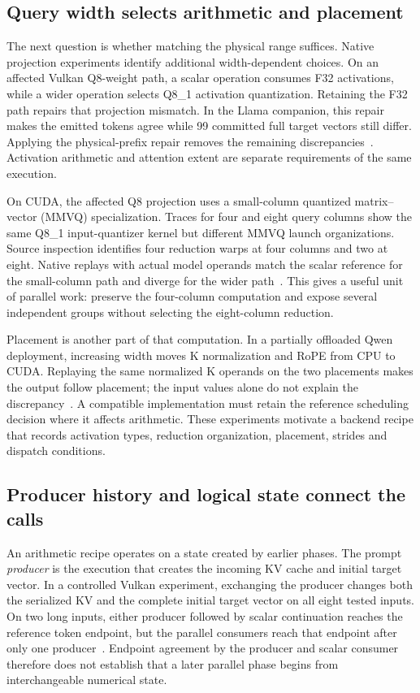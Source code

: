 \subsection{Query width selects arithmetic and placement}
The next question is whether matching the physical range suffices. Native projection experiments identify additional width-dependent choices. On an affected Vulkan Q8-weight path, a scalar operation consumes F32 activations, while a wider operation selects Q8\_1 activation quantization. Retaining the F32 path repairs that projection mismatch. In the Llama companion, this repair makes the emitted tokens agree while 99 committed full target vectors still differ. Applying the physical-prefix repair removes the remaining discrepancies~\cite{records}. Activation arithmetic and attention extent are separate requirements of the same execution.

On CUDA, the affected Q8 projection uses a small-column quantized matrix--vector (MMVQ) specialization. Traces for four and eight query columns show the same Q8\_1 input-quantizer kernel but different MMVQ launch organizations. Source inspection identifies four reduction warps at four columns and two at eight. Native replays with actual model operands match the scalar reference for the small-column path and diverge for the wider path~\cite{records}. This gives a useful unit of parallel work: preserve the four-column computation and expose several independent groups without selecting the eight-column reduction.

Placement is another part of that computation. In a partially offloaded Qwen deployment, increasing width moves K normalization and RoPE from CPU to CUDA. Replaying the same normalized K operands on the two placements makes the output follow placement; the input values alone do not explain the discrepancy~\cite{records}. A compatible implementation must retain the reference scheduling decision where it affects arithmetic. These experiments motivate a backend recipe that records activation types, reduction organization, placement, strides and dispatch conditions.

\subsection{Producer history and logical state connect the calls}
An arithmetic recipe operates on a state created by earlier phases. The prompt \emph{producer} is the execution that creates the incoming KV cache and initial target vector. In a controlled Vulkan experiment, exchanging the producer changes both the serialized KV and the complete initial target vector on all eight tested inputs. On two long inputs, either producer followed by scalar continuation reaches the reference token endpoint, but the parallel consumers reach that endpoint after only one producer~\cite{records}. Endpoint agreement by the producer and scalar consumer therefore does not establish that a later parallel phase begins from interchangeable numerical state.

